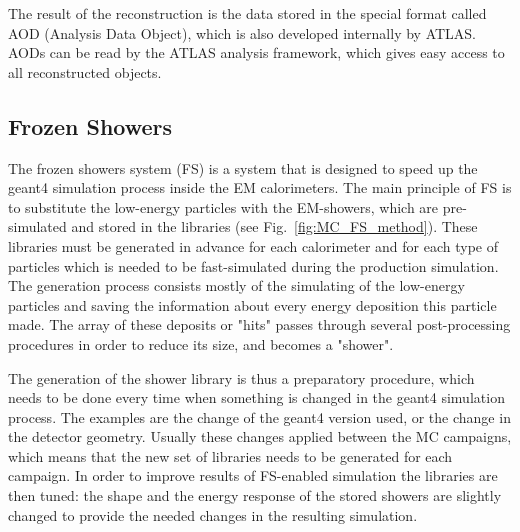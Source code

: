 The result of the reconstruction is the data stored in the special format called AOD (Analysis Data Object), which is also developed internally by ATLAS. AODs can be read by the ATLAS analysis framework, which gives easy access to all reconstructed objects.

\subsection{Frozen Showers}
\label{sec:MC_FS}
The frozen showers system (FS) is a system that is designed to speed up the geant4 simulation process inside the EM calorimeters. The main principle of FS is to substitute the low-energy particles with the EM-showers, which are pre-simulated and stored in the libraries (see Fig.~\ref{fig:MC_FS_method}). These libraries must be generated in advance for each calorimeter and for each type of particles which is needed to be fast-simulated during the production simulation. The generation process consists mostly of the simulating of the low-energy particles and saving the information about every energy deposition this particle made. The array of these deposits or "hits" passes through several post-processing procedures in order to reduce its size, and becomes a "shower".

\begin{figure}
\end{figure}

The generation of the shower library is thus a preparatory procedure, which needs to be done every time when something is changed in the geant4 simulation process. The examples are the change of the geant4 version used, or the change in the detector geometry. Usually these changes applied between the MC campaigns, which means that the new set of libraries needs to be generated for each campaign. In order to improve results of FS-enabled simulation the libraries are then tuned: the shape and the energy response of the stored showers are slightly changed to provide the needed changes in the resulting simulation.

